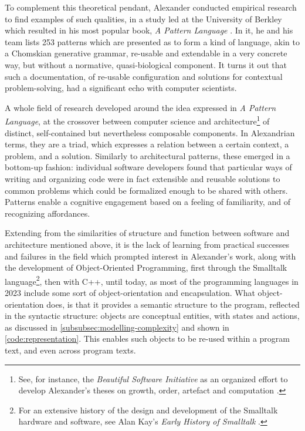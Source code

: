 To complement this theoretical pendant, Alexander conducted empirical research to find examples of such qualities, in a study led at the University of Berkley which resulted in his most popular book, \emph{A Pattern Language} \citep{alexander_pattern_1977}. In it, he and his team lists 253 patterns which are presented as to form a kind of language, akin to a Chomskian generative grammar, re-usable and extendable in a very concrete way, but without a normative, quasi-biological component. It turns it out that such a documentation, of re-usable configuration and solutions for contextual problem-solving, had a significant echo with computer scientists.

A whole field of research developed around the idea expressed in \emph{A Pattern Language}, at the crossover between computer science and architecture\footnote{See, for instance, the \emph{Beautiful Software Initiative} as an organized effort to develop Alexander's theses on growth, order, artefact and computation \citep{bryant_beautiful_2022}.} of distinct, self-contained but nevertheless composable components. In Alexandrian terms, they are a triad, which expresses a relation between a certain context, a problem, and a solution. Similarly to architectural patterns, these emerged in a bottom-up fashion: individual software developers found that particular ways of writing and organizing code were in fact extensible and reusable solutions to common problems which could be formalized enough to be shared with others. Patterns enable a cognitive engagement based on a feeling of familiarity, and of recognizing affordances.

Extending from the similarities of structure and function between software and architecture mentioned above, it is the lack of learning from practical successes and failures in the field which prompted interest in Alexander's work, along with the development of Object-Oriented Programming, first through the Smalltalk language\footnote{For an extensive history of the design and development of the Smalltalk hardware and software, see Alan Kay's \emph{Early History of Smalltalk} \citep{kay_early_1993}.}, then with C++, until today, as most of the programming languages in 2023 include some sort of object-orientation and encapsulation. What object-orientation does, is that it provides a semantic structure to the program, reflected in the syntactic structure: objects are conceptual entities, with states and actions, as discussed in \ref{subsubsec:modelling-complexity} and shown in \ref{code:representation}. This enables such objects to be re-used within a program text, and even across program texts.


